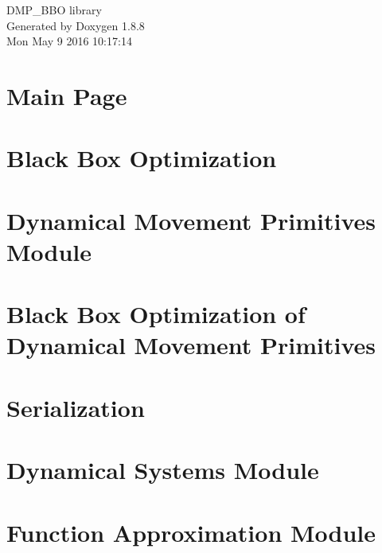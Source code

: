 \documentclass[twoside]{article}
\newcommand{\+}{\discretionary{\mbox{\scriptsize$\hookleftarrow$}}{}{}}
\begin{document}
\hypersetup{pageanchor=false,
             bookmarks=true,
             bookmarksnumbered=true,
             pdfencoding=unicode
            }
\begin{titlepage}
\vspace*{7cm}
\begin{center}%
{\Large D\+M\+P\+\_\+\+B\+B\+O library }\\
\vspace*{1cm}
{\large Generated by Doxygen 1.8.8}\\
\vspace*{0.5cm}
{\small Mon May 9 2016 10:17:14}\\
\end{center}
\end{titlepage}
\tableofcontents
{}
\hypersetup{pageanchor=true}

\section{Main Page}
\label{index}\hypertarget{index}{}
\section{Black Box Optimization}
\label{page_bbo}
\hypertarget{page_bbo}{}

\section{Dynamical Movement Primitives Module}
\label{page_dmp}
\hypertarget{page_dmp}{}

\section{Black Box Optimization of Dynamical Movement Primitives}
\label{page_dmp_bbo}
\hypertarget{page_dmp_bbo}{}

\section{Serialization}
\label{page_serialization}
\hypertarget{page_serialization}{}

\section{Dynamical Systems Module}
\label{page_dyn_sys}
\hypertarget{page_dyn_sys}{}

\section{Function Approximation Module}
\label{page_func_approx}
\hypertarget{page_func_approx}{}

\end{document}
